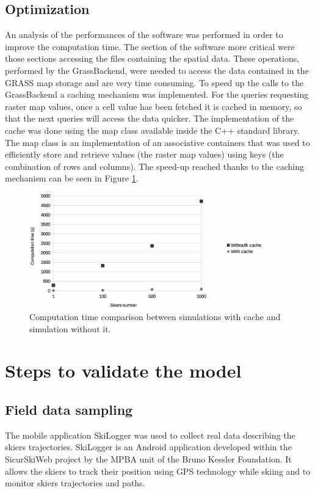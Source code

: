 \documentclass[12pt,a4paper,twoside]{book}
\begin{document}
\section{Optimization}
An analysis of the performances of the software was performed in order to improve the computation time. The section of the software more critical were those sections accessing the files containing the spatial data. These operations, performed by the GrassBackend, were needed to access the data contained in the GRASS map storage and are very time consuming. To speed up the calls to the GrassBackend a caching mechanism was implemented. For the queries requesting raster map values, once a cell value has been fetched it is cached in memory, so that the next queries will access the data quicker. The implementation of the cache was done using the map class available inside the C++ standard library. The map class is an implementation of an associative containers that was used to efficiently store and retrieve values (the raster map values) using keys (the combination of rows and columns). The speed-up reached thanks to the caching mechanism can be seen in Figure \ref{speed-up_cache}.

\begin{figure}[!h]
  \begin{center}
    \includegraphics[width=0.9\textwidth]{images/caching.eps}
    \caption{Computation time comparison between simulations with cache and simulation without it.}\label{speed-up_cache}
  \end{center}
\end{figure}

\chapter{Steps to validate the model}\label{steps_validate}
\section{Field data sampling}
The mobile application SkiLogger was used to collect real data describing the skiers trajectories. SkiLogger is an Android application developed within the SicurSkiWeb project by the MPBA unit of the Bruno Kessler Foundation. It allows the skiers to track their position using GPS technology while skiing and to monitor skiers trajectories and paths.
\end{document}
